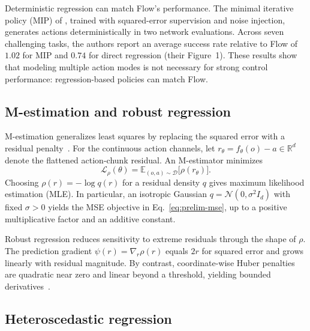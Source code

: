 Deterministic regression can match Flow's performance. The minimal iterative
policy (MIP) of \citet{pan2026much}, trained with squared-error supervision
and noise injection, generates actions deterministically in two network
evaluations.
Across seven challenging tasks, the authors report an average success rate
relative to Flow of $1.02$ for MIP and $0.74$ for direct regression
(their Figure~1). These results show that modeling multiple action modes
is not necessary for strong control performance: regression-based policies
can match Flow.

\subsection{M-estimation and robust regression}
\label{sec:prelim-m-estimation}

M-estimation generalizes least squares by replacing the squared error with
a residual penalty~\citep{huber1964robust}. For the continuous action
channels, let $r_\theta=f_\theta(o)-a\in\mathbb{R}^d$ denote the flattened
action-chunk residual. An M-estimator minimizes
\begin{equation}
    \mathcal{L}_{\rho}(\theta)
    = \mathbb{E}_{(o,a)\sim\mathcal{D}}
      \bigl[\rho(r_\theta)\bigr].
    \label{eq:prelim-m-estimation}
\end{equation}
Choosing $\rho(r)=-\log q(r)$ for a residual density $q$ gives maximum
likelihood estimation (MLE). In particular, an isotropic Gaussian
$q=\mathcal{N}(0,\sigma^2 I_d)$ with fixed $\sigma>0$ yields the MSE
objective in Eq.~\ref{eq:prelim-mse}, up to a positive multiplicative
factor and an additive constant.

Robust regression reduces sensitivity to extreme residuals through the
shape of $\rho$. The prediction gradient $\psi(r)=\nabla_r\rho(r)$ equals
$2r$ for squared error and grows linearly with residual magnitude.
By contrast, coordinate-wise Huber penalties are quadratic near zero and
linear beyond a threshold, yielding bounded derivatives~\citep{huber1964robust}.

\subsection{Heteroscedastic regression}
\label{sec:prelim-heteroscedastic}

